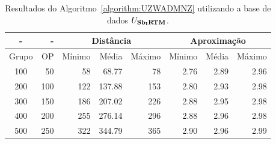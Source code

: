 \begin{table}[!htb]
  \caption{Resultados do Algoritmo~\ref{algorithm:UZWADMNZ} utilizando a base de dados $U_{\textbf{Sb\textsubscript{I}RTM}}{}$.}
  \label{table:KSZBCEZE}
  \centering
  \begin{tabular}{|c|r|r|r|r|r|r|r|}
    \hline
      -      &  -   & \multicolumn{3}{c|}{Distância}             & \multicolumn{3}{c|}{Aproximação}           \\ \hline
    Grupo    & OP   & Mínimo       & Média        & Máximo       & Mínimo       & Média        & Máximo       \\ \hline  
    100      & 50   & 58           &  68.77       & 78           & 2.76         & 2.89         & 2.96         \\ \hline
    200      & 100  & 122          & 137.88       & 153          & 2.80         & 2.93         & 2.98         \\ \hline
    300      & 150  & 186          & 207.02       & 226          & 2.88         & 2.95         & 2.98         \\ \hline
    400      & 200  & 255          & 276.14       & 296          & 2.88         & 2.96         & 2.98         \\ \hline
    500      & 250  & 322          & 344.79       & 365          & 2.90         & 2.96         & 2.99         \\ \hline    
  \end{tabular}
\end{table}
